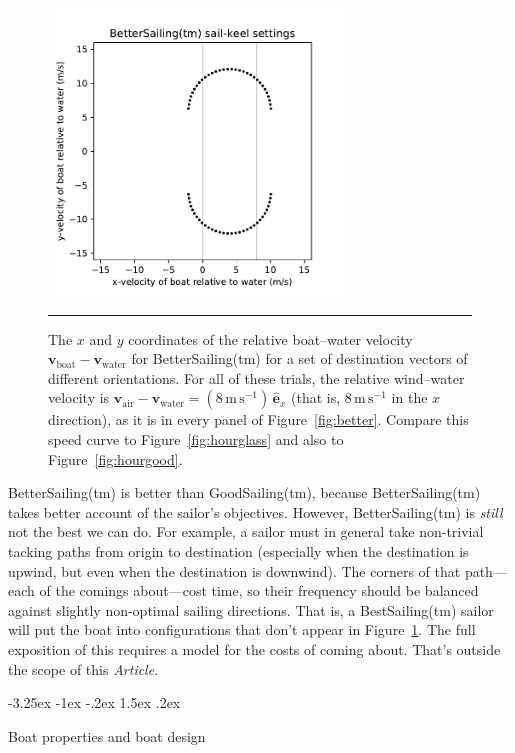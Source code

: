 \documentclass[letterpaper]{article}
\makeatletter
\renewcommand{\vec}[1]{\boldsymbol{#1}}
\newcommand{\uvec}{\vec{\hat{e}}}
\newcommand{\air}{\text{air}}
\newcommand{\water}{\text{water}}
\newcommand{\boat}{\text{boat}}
\newcommand{\vair}{\vec{v}_\air}
\newcommand{\vwater}{\vec{v}_\water}
\newcommand{\vboat}{\vec{v}_\boat}
\newcommand{\mps}{\mathrm{m\,s^{-1}}}
\newcommand{\documentname}{\textsl{Article}}
\newcommand{\figref}[1]{Figure~\ref{#1}}
\renewcommand\section{\@startsection {section}{1}{\z@}%
  {-3.25ex \@plus -1ex \@minus -.2ex}%
  {1.5ex \@plus .2ex}%
  {\raggedright\normalfont\large\bfseries}}
\newcommand{\figurerule}{\rule[1ex]{\textwidth}{0.2pt}}
\makeatother
\begin{document}
\begin{figure}[t!]
  ~\hfill\includegraphics[width=3in]{hourglass-better.pdf}\hfill~
  \caption{The $x$ and $y$ coordinates of the relative boat--water velocity $\vboat-\vwater$ for BetterSailing(tm) for a set of destination vectors of different orientations.
  For all of these trials, the relative wind--water velocity is $\vair-\vwater=(8\,\mps)\,\uvec_x$ (that is, $8\,\mps$ in the $x$ direction), as it is in every panel of \figref{fig:better}.
  Compare this speed curve to \figref{fig:hourglass} and also to \figref{fig:hourgood}.\label{fig:hourbetter}}
  \figurerule
\end{figure}

BetterSailing(tm) is better than GoodSailing(tm), because BetterSailing(tm) takes better account of the sailor's objectives.
However, BetterSailing(tm) is \emph{still} not the best we can do.
For example, a sailor must in general take non-trivial tacking paths from origin to destination (especially when the destination is upwind, but even when the destination is downwind).
The corners of that path---each of the comings about---cost time, so their frequency should be balanced against slightly non-optimal sailing directions.
That is, a BestSailing(tm) sailor will put the boat into configurations that don't appear in \figref{fig:hourbetter}.
The full exposition of this requires a model for the costs of coming about.
That's outside the scope of this \documentname.

\section{Boat properties and boat design}\label{sec:design}
\end{document}
